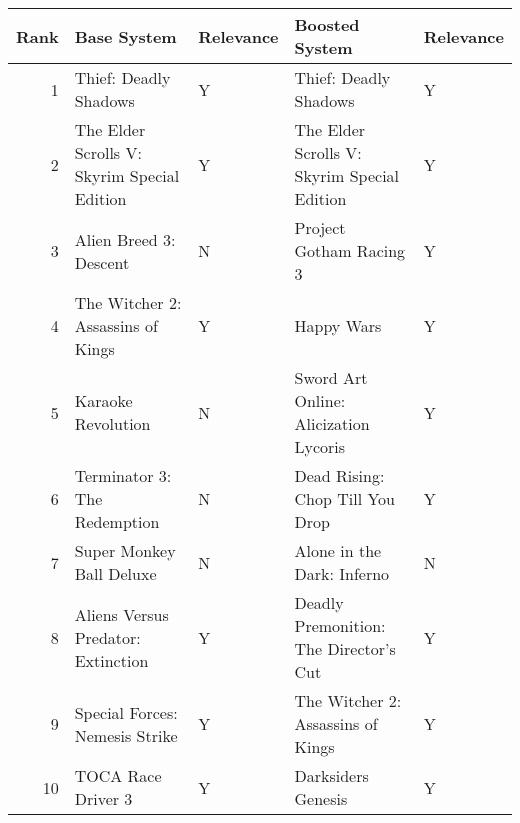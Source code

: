 \begin{tabular}{rllll}
\toprule
 Rank &                                 Base System & Relevance &                              Boosted System & Relevance \\
\midrule
    1 &                       Thief: Deadly Shadows &         Y &                       Thief: Deadly Shadows &         Y \\
    2 & The Elder Scrolls V: Skyrim Special Edition &         Y & The Elder Scrolls V: Skyrim Special Edition &         Y \\
    3 &                      Alien Breed 3: Descent &         N &                     Project Gotham Racing 3 &         Y \\
    4 &           The Witcher 2: Assassins of Kings &         Y &                                  Happy Wars &         Y \\
    5 &                          Karaoke Revolution &         N &       Sword Art Online: Alicization Lycoris &         Y \\
    6 &                Terminator 3: The Redemption &         N &             Dead Rising: Chop Till You Drop &         Y \\
    7 &                    Super Monkey Ball Deluxe &         N &                  Alone in the Dark: Inferno &         N \\
    8 &          Aliens Versus Predator: Extinction &         Y &      Deadly Premonition: The Director's Cut &         Y \\
    9 &              Special Forces: Nemesis Strike &         Y &           The Witcher 2: Assassins of Kings &         Y \\
   10 &                          TOCA Race Driver 3 &         Y &                          Darksiders Genesis &         Y \\
\bottomrule
\end{tabular}

